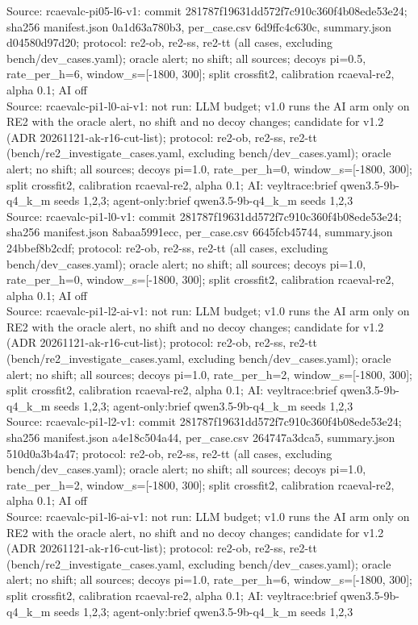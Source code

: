 \begin{table}[t]
Source: rcaevalc-pi05-l6-v1: commit 281787f19631dd572f7c910c360f4b08ede53e24; sha256 manifest.json 0a1d63a780b3, per\_case.csv 6d9ffc4c630c, summary.json d04580d97d20; protocol: re2-ob, re2-ss, re2-tt (all cases, excluding bench/dev\_cases.yaml); oracle alert; no shift; all sources; decoys pi=0.5, rate\_per\_h=6, window\_s=[-1800, 300]; split crossfit2, calibration rcaeval-re2, alpha 0.1; AI off\\
Source: rcaevalc-pi1-l0-ai-v1: not run: LLM budget; v1.0 runs the AI arm only on RE2 with the oracle alert, no shift and no decoy changes; candidate for v1.2 (ADR 20261121-ak-r16-cut-list); protocol: re2-ob, re2-ss, re2-tt (bench/re2\_investigate\_cases.yaml, excluding bench/dev\_cases.yaml); oracle alert; no shift; all sources; decoys pi=1.0, rate\_per\_h=0, window\_s=[-1800, 300]; split crossfit2, calibration rcaeval-re2, alpha 0.1; AI: veyltrace:brief qwen3.5-9b-q4\_k\_m seeds 1,2,3; agent-only:brief qwen3.5-9b-q4\_k\_m seeds 1,2,3\\
Source: rcaevalc-pi1-l0-v1: commit 281787f19631dd572f7c910c360f4b08ede53e24; sha256 manifest.json 8abaa5991ecc, per\_case.csv 6645fcb45744, summary.json 24bbef8b2cdf; protocol: re2-ob, re2-ss, re2-tt (all cases, excluding bench/dev\_cases.yaml); oracle alert; no shift; all sources; decoys pi=1.0, rate\_per\_h=0, window\_s=[-1800, 300]; split crossfit2, calibration rcaeval-re2, alpha 0.1; AI off\\
Source: rcaevalc-pi1-l2-ai-v1: not run: LLM budget; v1.0 runs the AI arm only on RE2 with the oracle alert, no shift and no decoy changes; candidate for v1.2 (ADR 20261121-ak-r16-cut-list); protocol: re2-ob, re2-ss, re2-tt (bench/re2\_investigate\_cases.yaml, excluding bench/dev\_cases.yaml); oracle alert; no shift; all sources; decoys pi=1.0, rate\_per\_h=2, window\_s=[-1800, 300]; split crossfit2, calibration rcaeval-re2, alpha 0.1; AI: veyltrace:brief qwen3.5-9b-q4\_k\_m seeds 1,2,3; agent-only:brief qwen3.5-9b-q4\_k\_m seeds 1,2,3\\
Source: rcaevalc-pi1-l2-v1: commit 281787f19631dd572f7c910c360f4b08ede53e24; sha256 manifest.json a4e18c504a44, per\_case.csv 264747a3dca5, summary.json 510d0a3b4a47; protocol: re2-ob, re2-ss, re2-tt (all cases, excluding bench/dev\_cases.yaml); oracle alert; no shift; all sources; decoys pi=1.0, rate\_per\_h=2, window\_s=[-1800, 300]; split crossfit2, calibration rcaeval-re2, alpha 0.1; AI off\\
Source: rcaevalc-pi1-l6-ai-v1: not run: LLM budget; v1.0 runs the AI arm only on RE2 with the oracle alert, no shift and no decoy changes; candidate for v1.2 (ADR 20261121-ak-r16-cut-list); protocol: re2-ob, re2-ss, re2-tt (bench/re2\_investigate\_cases.yaml, excluding bench/dev\_cases.yaml); oracle alert; no shift; all sources; decoys pi=1.0, rate\_per\_h=6, window\_s=[-1800, 300]; split crossfit2, calibration rcaeval-re2, alpha 0.1; AI: veyltrace:brief qwen3.5-9b-q4\_k\_m seeds 1,2,3; agent-only:brief qwen3.5-9b-q4\_k\_m seeds 1,2,3\\

\end{table}
